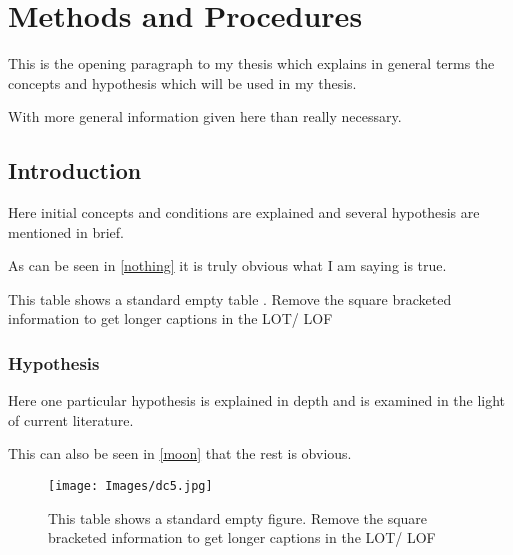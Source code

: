 \chapter{Methods and Procedures}

This is the opening paragraph to my thesis which
explains in general terms the concepts and hypothesis
which will be used in my thesis.

With more general information given here than really
necessary.

\section{Introduction}

Here initial concepts and conditions are explained and
several hypothesis are mentioned in brief.

As can be seen in \autoref{nothing} it is truly
obvious what I am saying is true.

\begin{table}[h!tb] \centering

    \caption[Short caption for List of Figures/ Tables]{This table shows a standard empty table \autocite{kleeHellyTheoremIts1963}. Remove the square bracketed information to get longer captions in the LOT/ LOF }
    \label{nothing}

    \vspace{ 2 in}
\end{table}

\subsection{Hypothesis}

Here one particular hypothesis is explained in depth
and is examined in the light of current literature.

This can also be seen in \autoref{moon} that the
rest is obvious.

\begin{figure}[h!tb] \centering

    \texttt{[image: Images/dc5.jpg]}
    \caption[Short caption for List of Figures/ Tables]{This table shows a standard empty figure. Remove the square bracketed information to get longer captions in the LOT/ LOF}
    \label{moon}
\end{figure}

